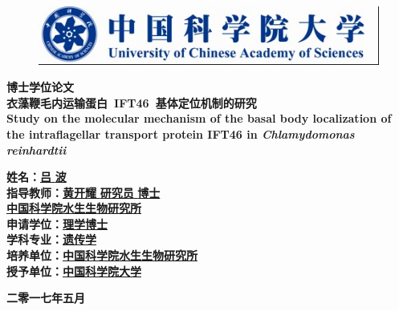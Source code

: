 \begin{titlepage}
\small
{}\uline{\makebox[7em][r]{}}\hfill {}
\uline{\makebox[7em][r]{}}

\uline{\makebox[7em][r]{}}\hfill {}
\uline{\makebox[7em][r]{}}
\normalsize

\vspace{10mm}

\begin{figure}[!h]
\centering
\graphicspath{{figures/}}
\includegraphics[trim=0 1 1 0, clip=true]{logo.jpg}
\end{figure}

\vspace{10mm}

\begin{center}
 \textbf{博士学位论文}\\[10mm]
 \textbf{衣藻鞭毛内运输蛋白\ IFT46\ 基体定位机制的研究}\\
 \textbf{Study on the molecular mechanism of the basal body localization of the intraflagellar transport protein IFT46 in \textit{Chlamydomonas reinhardtii}}\\[10mm]
\end{center}
\large \textbf{姓\qquad 名：}\uline{\hfill\textbf{吕}{} {} \textbf{波}\hfill}\\
\large \textbf{指导教师：}\uline{\hfill\textbf{黄开耀}{} {} \textbf{研究员}{} {} \textbf{博士}\hfill}\\
\large \makebox[5em][]{}\uline{\hfill{\textbf{中国科学院水生生物研究所}}\hfill}\\
\large \textbf{申请学位：}\uline{\hfill{\textbf{理学博士}}\hfill}\\
\large \textbf{学科专业：}\uline{\hfill{\textbf{遗传学}}\hfill}\\
\large \textbf{培养单位：}\uline{\hfill{\textbf{中国科学院水生生物研究所}}\hfill}\\
\large \textbf{授予单位：}\uline{\hfill{\textbf{中国科学院大学}}\hfill}\\[4mm]
\begin{center}
\textbf{二零一七年五月}
\end{center}
\end{titlepage}

\vspace*{10mm}
\thispagestyle{empty}
